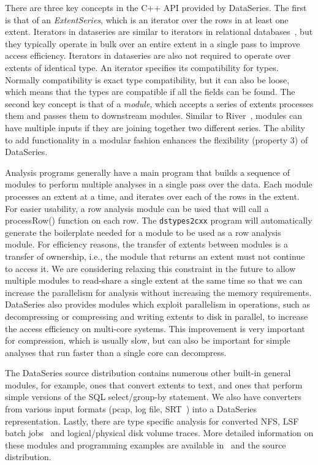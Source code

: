 \documentclass{acm_proc_article-sp}
\begin{document}
There are three key concepts in the C++ API provided by
DataSeries. The first is that of an \textit{ExtentSeries}, which is an
iterator over the rows in at least one extent.  Iterators in
dataseries are similar to iterators in relational
databases~\cite{graefeQueryProcessing93}, but they typically operate
in bulk over an entire extent in a single pass to improve access
efficiency.  Iterators in dataseries are also not required to operate
over extents of identical type.  An iterator specifies its
compatibility for types.  Normally compatibility is exact type
compatibility, but it can also be loose, which means that the types
are compatible if all the fields can be found.  The second key concept
is that of a \textit{module}, which accepts a series of extents
processes them and passes them to downstream modules.  Similar to
River~\cite{river99}, modules can have multiple inputs if they are
joining together two different series.  The ability to add
functionality in a modular fashion enhances the flexibility (property
3) of DataSeries.  


Analysis programs generally have a main program that builds a sequence
of modules to perform multiple analyses in a single pass over the
data. Each module processes an extent at a time, and iterates over
each of the rows in the extent.  For easier usability, a row analysis
module can be used that will call a processRow() function on each row.
The {\tt dstypes2cxx} program will automatically generate the boilerplate
needed for a module to be used as a row analysis module.
For efficiency reasons, the transfer of extents between
modules is a transfer of ownership, i.e., the module that returns an
extent must not continue to access it. We are considering relaxing
this constraint in the future to allow multiple modules to read-share
a single extent at the same time so that we can increase the 
parallelism for analysis without increasing the memory requirements.
DataSeries also provides modules which exploit parallelism in
operations, such as decompressing or compressing and writing extents
to disk in parallel, 
to increase the access efficiency on
multi-core systems.  This improvement is very important for
compression, which is usually slow, but can also be important for
simple analyses that run faster than a single core can decompress.

The DataSeries source distribution contains numerous other built-in
general modules, for example, ones that convert extents to text, and
ones that perform simple versions of the SQL select/group-by
statement.  We also have converters from various input formats (pcap,
log file, SRT~\cite{SRT}) into a DataSeries representation.  Lastly,
there are type specific analysis for converted NFS, LSF batch
jobs~\cite{PlatformLSF} and logical/physical disk volume traces.  More
detailed information on these modules and programming examples are
available 
in~\cite{DSTechnicalReportSnapshot} and the source distribution.
\end{document}
